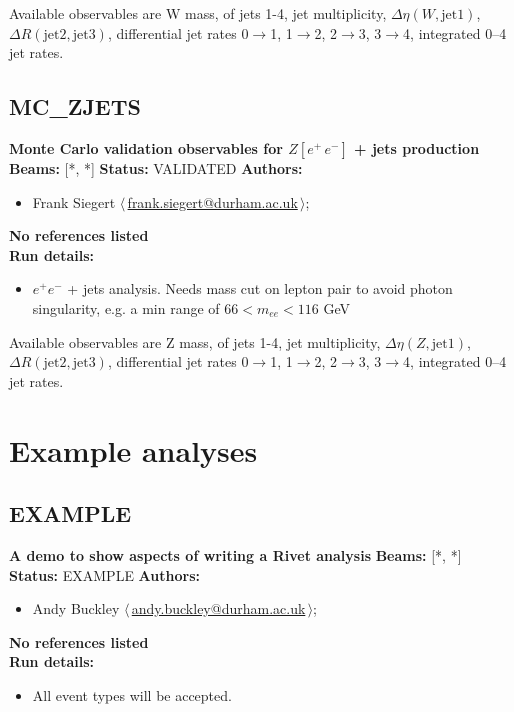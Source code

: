 \noindent Available observables are W mass, \pT of jets 1-4, jet multiplicity, $\Delta\eta(W, \text{jet1})$, $\Delta R(\text{jet2}, \text{jet3})$, differential jet rates 0\ensuremath{\to}1, 1\ensuremath{\to}2, 2\ensuremath{\to}3, 3\ensuremath{\to}4, integrated 0--4 jet rates.

\clearpage


\clearpage

\subsection{MC\_ZJETS}
\textbf{Monte Carlo validation observables for $Z[e^+ \, e^-]$ + jets production}\newline
\textbf{Beams:} [*, *] \newline
\textbf{Status:} VALIDATED\newline
\textbf{Authors:}
\begin{itemize}
  \item Frank Siegert $\langle\,$\href{mailto:frank.siegert@durham.ac.uk}{frank.siegert@durham.ac.uk}$\,\rangle$;
\end{itemize}
\textbf{No references listed}\\ 
\textbf{Run details:}
\begin{itemize}

  \item $e^+ e^-$ + jets analysis. Needs mass cut on lepton pair to avoid photon singularity, e.g. a min range of $66 < m_{ee} < 116$ GeV\end{itemize}

\noindent Available observables are Z mass, \pT of jets 1-4, jet multiplicity, $\Delta\eta(Z, \text{jet1})$, $\Delta R(\text{jet2}, \text{jet3})$, differential jet rates 0\ensuremath{\to}1, 1\ensuremath{\to}2, 2\ensuremath{\to}3, 3\ensuremath{\to}4, integrated 0--4 jet rates.

\clearpage


\section{Example analyses}\subsection{EXAMPLE}
\textbf{A demo to show aspects of writing a Rivet analysis}\newline
\textbf{Beams:} [*, *] \newline
\textbf{Status:} EXAMPLE\newline
\textbf{Authors:}
\begin{itemize}
  \item Andy Buckley $\langle\,$\href{mailto:andy.buckley@durham.ac.uk}{andy.buckley@durham.ac.uk}$\,\rangle$;
\end{itemize}
\textbf{No references listed}\\ 
\textbf{Run details:}
\begin{itemize}

  \item All event types will be accepted.\end{itemize}

